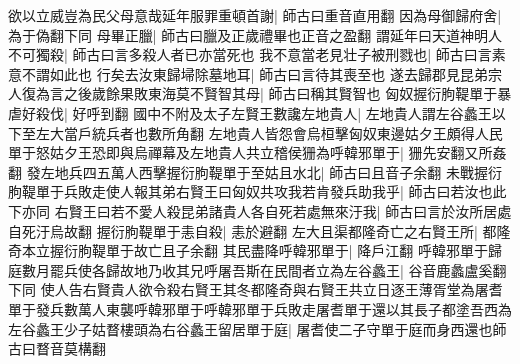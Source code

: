 欲以立威豈為民父母意哉延年服罪重頓首謝|{
	師古曰重音直用翻}
因為母御歸府舍|{
	為于偽翻下同}
母畢正臘|{
	師古曰臘及正歲禮畢也正音之盈翻}
謂延年曰天道神明人不可獨殺|{
	師古曰言多殺人者已亦當死也}
我不意當老見壮子被刑戮也|{
	師古曰言素意不謂如此也}
行矣去汝東歸埽除墓地耳|{
	師古曰言待其喪至也}
遂去歸郡見昆弟宗人復為言之後歲餘果敗東海莫不賢智其母|{
	師古曰稱其賢智也}
匈奴握衍朐鞮單于暴虐好殺伐|{
	好呼到翻}
國中不附及太子左賢王數讒左地貴人|{
	左地貴人謂左谷蠡王以下至左大當戶統兵者也數所角翻}
左地貴人皆怨會烏桓擊匈奴東邊姑夕王頗得人民單于怒姑夕王恐即與烏禪幕及左地貴人共立稽侯㹪為呼韓邪單于|{
	㹪先安翻又所姦翻}
發左地兵四五萬人西擊握衍朐鞮單于至姑且水北|{
	師古曰且音子余翻}
未戰握衍朐鞮單于兵敗走使人報其弟右賢王曰匈奴共攻我若肯發兵助我乎|{
	師古曰若汝也此下亦同}
右賢王曰若不愛人殺昆弟諸貴人各自死若處無來汙我|{
	師古曰言於汝所居處自死汙烏故翻}
握衍朐鞮單于恚自殺|{
	恚於避翻}
左大且渠都隆奇亡之右賢王所|{
	都隆奇本立握衍朐鞮單于故亡且子余翻}
其民盡降呼韓邪單于|{
	降戶江翻}
呼韓邪單于歸庭數月罷兵使各歸故地乃收其兄呼屠吾斯在民間者立為左谷蠡王|{
	谷音鹿蠡盧奚翻下同}
使人告右賢貴人欲令殺右賢王其冬都隆奇與右賢王共立日逐王薄胥堂為屠耆單于發兵數萬人東襲呼韓邪單于呼韓邪單于兵敗走屠耆單于還以其長子都塗吾西為左谷蠡王少子姑瞀樓頭為右谷蠡王留居單于庭|{
	屠耆使二子守單于庭而身西還也師古曰瞀音莫構翻}


